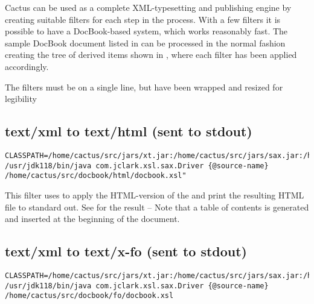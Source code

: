 
Cactus can be used as a complete XML-typesetting and publishing engine
by creating suitable filters for each step in the process.  With a few
filters it is possible to have a DocBook-based system, which works
reasonably fast.  The sample DocBook document listed in
 can be processed in the normal fashion
creating the tree of derived items shown in
, where each filter has been applied accordingly.


The filters must be on a single line, but have been wrapped and resized for legibility
\subsection*{text/xml to text/html (sent to stdout)}
{\footnotesize
\begin{verbatim}
CLASSPATH=/home/cactus/src/jars/xt.jar:/home/cactus/src/jars/sax.jar:/home/cactus/src/jars/xp.jar
/usr/jdk118/bin/java com.jclark.xsl.sax.Driver {@source-name} /home/cactus/src/docbook/html/docbook.xsl"
\end{verbatim}
}
This filter uses  to
apply the HTML-version of the
 and print the resulting HTML file to standard out.  See
 for the result --  Note that a table of
  contents is generated and inserted at the beginning of the document.



\subsection*{text/xml to text/x-fo (sent to stdout)}
  {\footnotesize
\begin{verbatim}
CLASSPATH=/home/cactus/src/jars/xt.jar:/home/cactus/src/jars/sax.jar:/home/cactus/src/jars/xp.jar
/usr/jdk118/bin/java com.jclark.xsl.sax.Driver {@source-name} /home/cactus/src/docbook/fo/docbook.xsl
\end{verbatim}
  }

